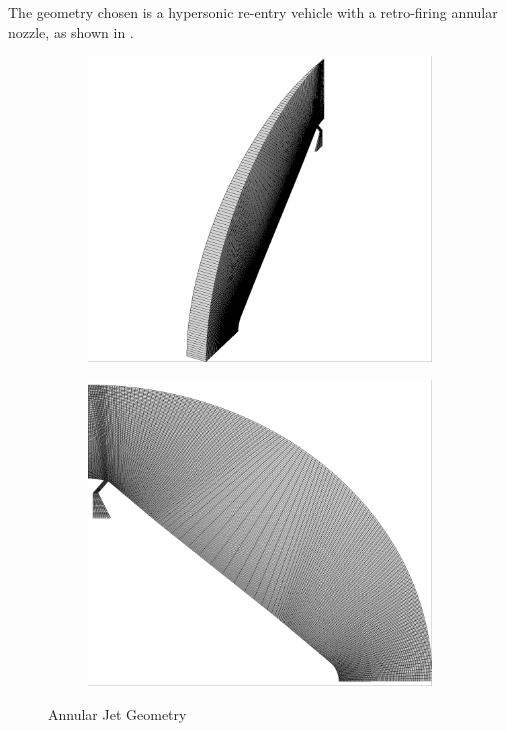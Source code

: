 The geometry chosen is a hypersonic re-entry vehicle with a retro-firing annular
nozzle, as shown in .
\begin{figure}[h]
  \centering
	\begin{subfigure}[b]{0.4\textwidth}
    \centering
    \includegraphics[width=\textwidth]{figures/all_iso.png}
  \end{subfigure}
	\begin{subfigure}[b]{0.4\textwidth}
    \centering
    \includegraphics[width=\textwidth]{figures/all_side.png}
  \end{subfigure}
  \caption{Annular Jet Geometry}
  \label{fig:annular-jet-side}
\end{figure}
